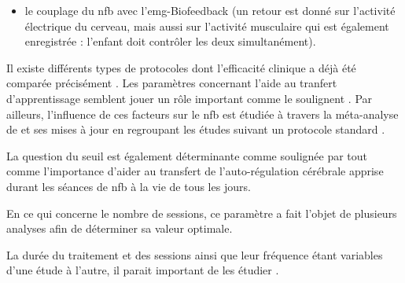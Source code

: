 \begin{itemize}
\begin{itemize}
		\item le couplage du \gls{nfb} avec l'\gls{emg}-Biofeedback (un retour est donné sur l'activité électrique du cerveau, mais aussi sur l'activité musculaire qui est 
		également enregistrée : l'enfant doit
		contrôler les deux simultanément).
		\end{itemize}
Il existe différents types de protocoles dont l'efficacité clinique a déjà été comparée précisément
\citep{Leins2007, Heinrich2019}. Les paramètres concernant l'aide au tranfert d'apprentissage semblent jouer un rôle important comme le soulignent \citet{Arns2014, Gani2008, Strehl2006}.
Par ailleurs, l'influence de ces facteurs sur le \gls{nfb} est étudiée à travers la méta-analyse de \citet{Cortese2016} et ses mises à jour en regroupant les études suivant un protocole standard
\citep{Arns2014}.

La question du seuil est également déterminante comme soulignée par \citet{Arns2014, Strehl2014} tout comme l'importance d'aider au transfert de l'auto-régulation cérébrale
apprise durant les séances de \gls{nfb} à la vie de tous les jours. 

En ce qui concerne le nombre de sessions, ce paramètre a fait l'objet de plusieurs analyses \citep{Cortese2016, Arns2009,
Arns2014, Enriquez2017} afin de déterminer sa valeur optimale. 

La durée du traitement et des sessions ainsi que leur fréquence étant variables d'une étude à l'autre, il parait important
de les étudier \citep{Enriquez2017}. 


\end{itemize}
